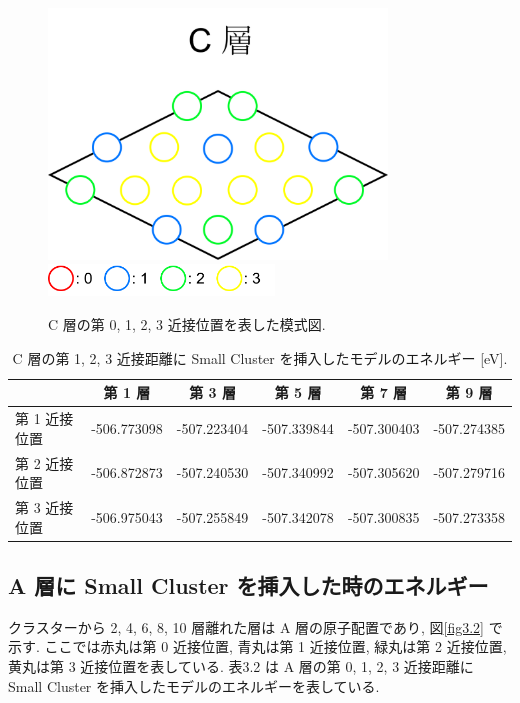 \begin{figure}[htbp]
	\begin{center}
		\includegraphics[width=90mm]{../method/Clayer.png}
		\includegraphics[width=60mm]{../method/AClayer.png}
		\caption{C 層の第 0, 1, 2, 3 近接位置を表した模式図.}
		\label{fig3.1}
	\end{center}
\end{figure}

\begin{table}[htb]
\caption{C 層の第 1, 2, 3 近接距離に Small Cluster を挿入したモデルのエネルギー [eV].}
  \begin{center}
    \begin{tabular}{|l|c|c|c|c|c|} \hline
         & 第 1 層 & 第 3 層 & 第 5 層 & 第 7 層 & 第 9 層\\ \hline
第 1 近接位置 & -506.773098 & -507.223404 & -507.339844 & -507.300403 & -507.274385\\
\hline
第 2 近接位置 & -506.872873 & -507.240530 & -507.340992 & -507.305620 & -507.279716\\
\hline
第 3 近接位置 & -506.975043 & -507.255849 & -507.342078 & -507.300835 & -507.273358\\
\hline
    \end{tabular}
  \end{center}
\end{table}


\subsection{A 層に Small Cluster を挿入した時のエネルギー}
クラスターから 2, 4, 6, 8, 10 層離れた層は A 層の原子配置であり, 図\ref{fig3.2} で示す. ここでは赤丸は第 0 近接位置, 青丸は第 1 近接位置, 緑丸は第 2 近接位置, 黄丸は第 3 近接位置を表している. 表3.2 は A 層の第 0, 1, 2, 3 近接距離に Small Cluster を挿入したモデルのエネルギーを表している.

